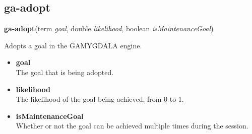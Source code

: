 \subsection{ga-adopt}

\textbf{ga-adopt}(term \emph{goal}, double \emph{likelihood}, boolean \emph{isMaintenanceGoal})

Adopts a goal in the GAMYGDALA engine.

\begin{itemize}
	\item \textbf{goal} \\ The goal that is being adopted.
	\item \textbf{likelihood} \\ The likelihood of the goal being achieved, from 0 to 1.
	\item \textbf{isMaintenanceGoal} \\ Whether or not the goal can be achieved multiple times during the session.
\end{itemize}


